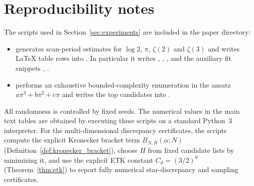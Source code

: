 
\section{Reproducibility notes}
\label{app:reproducibility}

The scripts used in Section~\ref{sec:experiments} are included in the paper directory:
\begin{itemize}
\item {} generates scan-period estimates for $\log 2$, $\pi$, $\zeta(2)$ and $\zeta(3)$ and writes \LaTeX{} table rows into . In particular it writes , , ,  and the auxiliary fit snippets , .
\item {} performs an exhaustive bounded-complexity enumeration in the ansatz $a\pi^3+b\pi^2+c\pi$ and writes the top candidates into .
\end{itemize}

All randomness is controlled by fixed seeds. The numerical values in the main text tables are obtained by executing these scripts on a standard Python~3 interpreter.
For the multi-dimensional discrepancy certificates, the scripts compute the explicit Kronecker bracket term $B_{N,H}(\alpha;N)$ (Definition~\ref{def:kronecker_bracket}), choose $H$ from fixed candidate lists by minimizing it, and use the explicit ETK constant $C_d=(3/2)^d$ (Theorem~\ref{thm:etk}) to report fully numerical star-discrepancy and sampling certificates.


